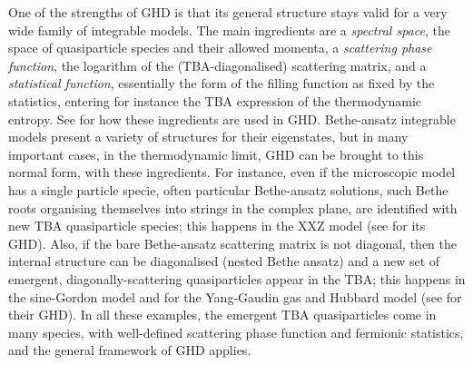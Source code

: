 \documentclass[twocolumn,amsfonts,showpacs,superscriptaddress]{revtex4-1}
\begin{document}
\begin{widetext}
One of the strengths of GHD is that its general structure stays valid for a very wide family of integrable models. The main ingredients are a {\em spectral space}, the space of quasiparticle species and their allowed momenta, a {\em scattering phase function}, the logarithm of the (TBA-diagonalised) scattering matrix, and a {\em statistical function}, essentially the form of the filling function as fixed by the statistics, entering for instance the TBA expression of the thermodynamic entropy. See \cite{notes} for how these ingredients are used in GHD. Bethe-ansatz integrable models present a variety of structures for their eigenstates, but in many important cases, in the thermodynamic limit, GHD can be brought to this normal form, with these ingredients. For instance, even if the microscopic model has a single particle specie, often particular Bethe-ansatz solutions, such Bethe roots organising themselves into strings in the complex plane, are identified with new TBA quasiparticle species; this happens in the XXZ model (see \cite{bertini2016transport} for its GHD). Also, if the bare Bethe-ansatz scattering matrix is not diagonal, then the internal structure can be diagonalised (nested Bethe ansatz) and a new set of emergent, diagonally-scattering quasiparticles appear in the TBA; this happens in the sine-Gordon model and for the Yang-Gaudin gas and Hubbard model (see \cite{PhysRevB.100.035108,mestyan2019GHD,PhysRevB.96.081118,nozawa2020generalized} for their GHD). In all these examples, the emergent TBA quasiparticles come in many species, with well-defined scattering phase function and fermionic statistics, and the general framework of GHD applies.


\end{widetext}
\end{document}
